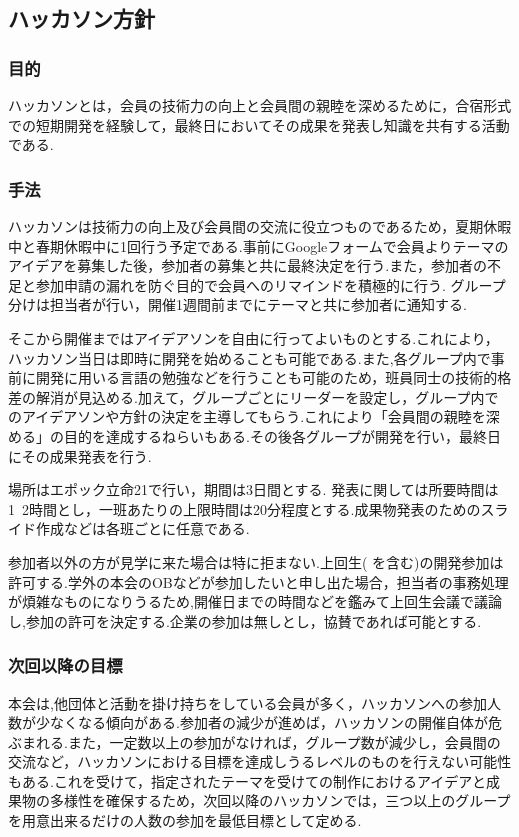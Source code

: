 \subsection*{ハッカソン方針}

\subsubsection*{目的}
ハッカソンとは，会員の技術力の向上と会員間の親睦を深めるために，合宿形式での短期開発を経験して，最終日においてその成果を発表し知識を共有する活動である.


\subsubsection*{手法}
ハッカソンは技術力の向上及び会員間の交流に役立つものであるため，夏期休暇中と春期休暇中に1回行う予定である.事前にGoogleフォームで会員よりテーマのアイデアを募集した後，参加者の募集と共に最終決定を行う.また，参加者の不足と参加申請の漏れを防ぐ目的で会員へのリマインドを積極的に行う.
グループ分けは担当者が行い，開催1週間前までにテーマと共に参加者に通知する.

そこから開催まではアイデアソンを自由に行ってよいものとする.これにより，ハッカソン当日は即時に開発を始めることも可能である.また,各グループ内で事前に開発に用いる言語の勉強などを行うことも可能のため，班員同士の技術的格差の解消が見込める.加えて，グループごとにリーダーを設定し，グループ内でのアイデアソンや方針の決定を主導してもらう.これにより「会員間の親睦を深める」の目的を達成するねらいもある.その後各グループが開発を行い，最終日にその成果発表を行う.

場所はエポック立命21で行い，期間は3日間とする.
発表に関しては所要時間は1~2時間とし，一班あたりの上限時間は20分程度とする.成果物発表のためのスライド作成などは各班ごとに任意である.

参加者以外の方が見学に来た場合は特に拒まない.上回生(\fourthGrade{} を含む)の開発参加は許可する.学外の本会のOBなどが参加したいと申し出た場合，担当者の事務処理が煩雑なものになりうるため,開催日までの時間などを鑑みて上回生会議で議論し,参加の許可を決定する.企業の参加は無しとし，協賛であれば可能とする.



\subsubsection*{次回以降の目標}
本会は,他団体と活動を掛け持ちをしている会員が多く，ハッカソンへの参加人数が少なくなる傾向がある.参加者の減少が進めば，ハッカソンの開催自体が危ぶまれる.また，一定数以上の参加がなければ，グループ数が減少し，会員間の交流など，ハッカソンにおける目標を達成しうるレベルのものを行えない可能性もある.これを受けて，指定されたテーマを受けての制作におけるアイデアと成果物の多様性を確保するため，次回以降のハッカソンでは，三つ以上のグループを用意出来るだけの人数の参加を最低目標として定める.
